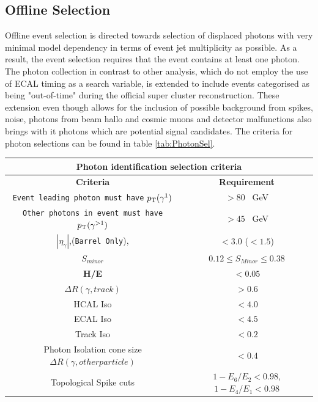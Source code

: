 \subsection{Offline Selection}
Offline event selection is directed towards selection of displaced photons with very minimal model dependency in terms of event jet multiplicity as possible. As a result, the event selection requires that the event contains at least one photon. The photon collection in contrast to other analysis, which do not employ the use of ECAL timing as a search variable, is extended to include events categorised as being "out-of-time" during the official super cluster reconstruction. These extension even though allows for the inclusion of possible background from spikes, noise, photons from beam hallo and cosmic muons and detector malfunctions also brings with it photons which are potential signal candidates.
The criteria for photon selections can be found in table \ref{tab:PhotonSel}. 

\begin{center}
\centering
\begin{tabular}{c c }
\multicolumn{2}{c}{\bfseries{Photon identification selection criteria}} \\
  \hline 
  \bfseries{Criteria} & \bfseries{Requirement} \\
   \hline 
  \texttt{Event leading photon must have} $p_{\mathrm{T}}(\gamma^{1})$  & $ > 80$~ GeV \\
  \texttt{Other photons in event must have} $p_{\mathrm{T}}(\gamma^{>1})$  & $ > 45$~ GeV \\
  
 $|\eta_{\gamma}|$,(\texttt{Barrel Only}),  & $ < 3.0$ ($ < 1.5$) \\
 $S_{minor}$  & $ 0.12 \leq S_{Minor} \leq 0.38$ \\
 \textbf{H/E}  & $ < 0.05$ \\
 
 $\Delta R(\gamma, track)$  & $ > 0.6 $ \\
 
 HCAL Iso  & $ < 4.0 $ \\
 ECAL Iso   & $ < 4.5 $ \\
 Track Iso   & $ < 0.2 $ \\
 Photon Isolation cone size $\Delta R(\gamma, other particle)$ & $< 0.4$ \\
 Topological Spike cuts  & $1 - E_{6}/E_{2} < 0.98$, $ 1 - E_{4}/E_{1} < 0.98$ \\ 
  \hline 
\end{tabular}
\label{tab:PhotonSel}
\end{center}

